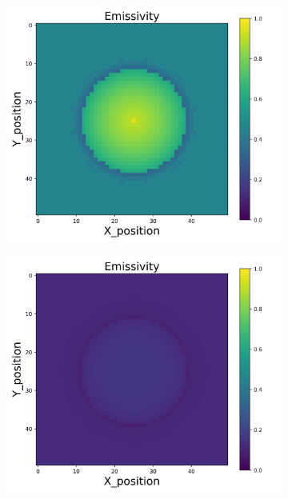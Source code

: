 {\begin{figure}[h]
    \centering
    \begin{minipage}{\textwidth}
        \centering
        \begin{subfigure}{0.27\textwidth}
            \centering
            \includegraphics[width=\textwidth]{figures/raw_data/0/T3500/linear/emi_cal.jpg}
        \end{subfigure}
        \begin{subfigure}{0.27\textwidth}
            \centering
            \includegraphics[width=\textwidth]{figures/raw_data/5/T3500/linear/emi_cal.jpg}

\end{subfigure}
\end{minipage}
\end{figure}}
